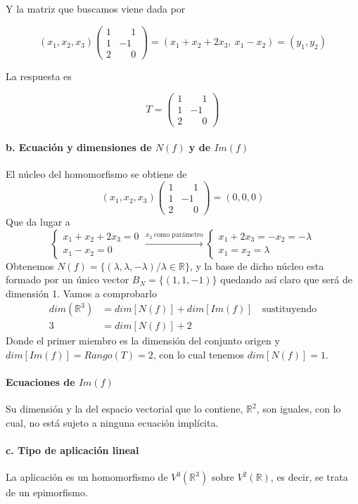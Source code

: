 \begin{problema}{\cite[11p347]{palacios}}
	Y la matriz que buscamos viene dada por

	$$(x_1,x_2,x_3)
	\begin{pmatrix}
		1 & \phantom{-}1 \\
		1 & -1\\
		2 & \phantom{-}0
	\end{pmatrix}
	=(x_1+x_2+2x_3,\ x_1-x_2)=(y_1, y_2)$$
	
	La respuesta es
	
	$$T=\begin{pmatrix}
		1 & \phantom{-}1 \\
		1 & -1\\
		2 & \phantom{-}0
	\end{pmatrix}$$

	\paragraph{b. Ecuación y dimensiones de $N(f)$ y de $Im(f)$} El núcleo del homomorfismo se obtiene de
	$$(x_1,x_2,x_3)
	\begin{pmatrix}
		1 & \phantom{-}1 \\
		1 & -1\\
		2 & \phantom{-}0
	\end{pmatrix}=(0,0,0)$$
	Que da lugar a
	$$
	\begin{cases}
		x_1+x_2+2x_3=0 \\
		x_1-x_2=0
	\end{cases}
	\xrightarrow{\scriptstyle{x_2\ \text{como parámetro}}}
	\begin{cases}
		x_1+2x_3=-x_2=-\lambda \\
		x_1=x_2=\lambda
	\end{cases}$$
	Obtenemos $N(f)=\{(\lambda,\lambda,-\lambda)/\lambda\in\mathbb{R}\}$, y la base 
	de dicho núcleo esta formado por un único vector $B_N=\{(1,1,-1)\}$ quedando así claro que será 
	de dimensión 1. Vamos a comprobarlo
	\begin{align*}
		dim(\mathbb{R}^3) &= dim[N(f)]+dim[Im(f)] \quad \scriptstyle{\text{sustituyendo}}\\
		3 &= dim[N(f)] + 2
	\end{align*}
	Donde el primer miembro es la dimensión del conjunto origen y $dim[Im(f)]=Rango(T)=2$, con lo
	cual tenemos $dim[N(f)]=1$.

	\paragraph{Ecuaciones de $Im(f)$} Su dimensión y la del espacio vectorial que lo
	contiene, $\mathbb{R}^2$, son iguales, con lo cual, no está sujeto a ninguna ecuación implícita.

	\paragraph{c. Tipo de aplicación lineal} La aplicación es un homomorfismo de $V^3(\mathbb{R}^3)$ sobre
	$V^2(\mathbb{R})$, es decir, se trata de un epimorfismo.
\end{problema}

